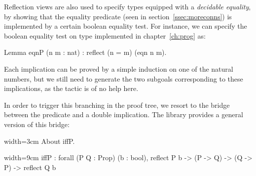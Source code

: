 Reflection views are also used to specify types equipped with a
\emph{decidable equality}, by showing that the equality predicate
 (seen in section~\ref{ssec:moreconns}) is implemented by a
certain boolean equality test. For instance, we can specify the
boolean equality test on type  implemented in
chapter~\ref{ch:prog} as:

\begin{coq}{}{}
Lemma eqnP (n m : nat) : reflect (n = m) (eqn n m).
\end{coq}

Each implication can be proved by a simple induction on one of the
natural numbers, but we still need to generate the two subgoals
corresponding to these implications, as the  tactic is of no
help here.



In order to trigger this branching in the proof tree, we resort to the
bridge between the  predicate and a double implication.
The  library provides a general version of
this bridge:

\begin{coq-left}{}{width=3cm}
About iffP.
$~$
$~$
\end{coq-left}
\begin{coqout-right}{}{width=9cm}
iffP : forall (P Q : Prop) (b : bool),
  reflect P b -> (P -> Q) -> (Q -> P) ->
    reflect Q b
\end{coqout-right}

